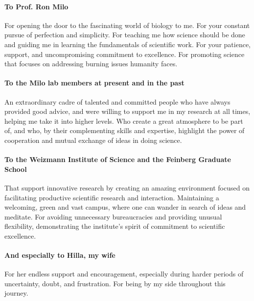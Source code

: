 \paragraph{To Prof. Ron Milo}
For opening the door to the fascinating world of biology to me.
For your constant pursue of perfection and simplicity.
For teaching me how science should be done and guiding me in learning the fundamentals of scientific work.
For your patience, support, and uncompromising commitment to excellence.
For promoting science that focuses on addressing burning issues humanity faces.
\paragraph{To the Milo lab members at present and in the past}
An extraordinary cadre of talented and committed people who have always provided good advice, and were willing to support me in my research at all times, helping me take it into higher levels.
Who create a great atmosphere to be part of, and who, by their complementing skills and expertise, highlight the power of cooperation and mutual exchange of ideas in doing science.
\paragraph{To the Weizmann Institute of Science and the Feinberg Graduate School}
That support innovative research by creating an amazing environment focused on facilitating productive scientific research and interaction.
Maintaining a welcoming, green and vast campus, where one can wander in search of ideas and meditate.
For avoiding unnecessary bureaucracies and providing unusual flexibility, demonstrating the institute's spirit of commitment to scientific excellence.
\paragraph{And especially to Hilla, my wife}
For her endless support and encouragement, especially during harder periods of uncertainty, doubt, and frustration.
For being by my side throughout this journey.
